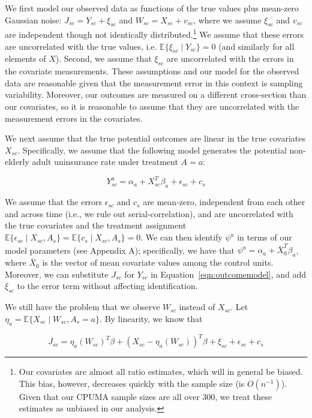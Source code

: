 We first model our observed data as functions of the true values plus mean-zero Gaussian noise: $J_{sc} = Y_{sc} + \xi_{sc}$ and $W_{sc} = X_{sc} + v_{sc}$, where we assume $\xi_{sc}$ and $v_{sc}$ are independent though not identically distributed.\footnote{Our covariates are almost all ratio estimates, which will in general be biased. This bias, however, decreases quickly with the sample size (is $O(n^{-1})$). Given that our CPUMA sample sizes are all over 300, we treat these estimates as unbiased in our analysis.} We assume that these errors are uncorrelated with the true values, i.e. $\mathbb{E}\{\xi_{sc} \mid Y_{sc}\} = 0$ (and similarly for all elements of $X$). Second, we assume that $\xi_{sc}$ are uncorrelated with the errors in the covariate measurements. These assumptions and our model for the observed data are reasonable given that the measurement error in this context is sampling variability. Moreover, our outcomes are measured on a different cross-section than our covariates, so it is reasonable to assume that they are uncorrelated with the measurement errors in the covariates. 

We next assume that the true potential outcomes are linear in the true covariates $X_{sc}$. Specifically, we assume that the following model generates the potential non-elderly adult uninsurance rate under treatment $A = a$:

\begin{equation}\label{eqn:outcomemodel}
Y_{sc}^a = \alpha_a + X_{sc}^T\beta_a + \epsilon_{sc} + c_s
\end{equation}

We assume that the errors $\epsilon_{sc}$ and $c_s$ are mean-zero, independent from each other and across time (i.e., we rule out serial-correlation), and are uncorrelated with the true covariates and the treatment assignment $\mathbb{E}\{\epsilon_{sc} \mid X_{sc}, A_s\} = \mathbb{E}\{c_s \mid X_{sc}, A_s\} = 0$. We can then identify $\psi^a$ in terms of our model parameters (see Appendix A); specifically, we have that $\psi^a = \alpha_a + \bar{X}_0^T\beta_a$, where $\bar{X}_0$ is the vector of mean covariate values among the control units. Moreover, we can substitute $J_{sc}$ for $Y_{sc}$ in Equation~\ref{eqn:outcomemodel}, and add $\xi_{sc}$ to the error term without affecting identification. 

We still have the problem that we observe $W_{sc}$ instead of $X_{sc}$. Let $\eta_a = \mathbb{E}\{X_{sc} \mid W_{sc}, A_s = a\}$. By linearity, we know that

\begin{equation}
    J_{sc} = \eta_a(W_{sc})^T\beta + (X_{sc} - \eta_a(W_{sc}))^T\beta + \xi_{sc} + \epsilon_{sc} + c_s 
\end{equation}

